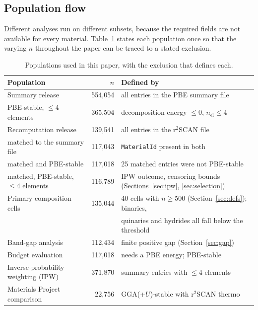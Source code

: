 \documentclass[11pt]{article}
\begin{document}
\subsection{Population flow}\label{sec:popflow}

Different analyses run on different subsets, because the required fields are not
available for every material. Table~\ref{tab:popflow} states each population once so that
the varying $n$ throughout the paper can be traced to a stated exclusion.

\begin{table}[htbp]\centering
\caption{Populations used in this paper, with the exclusion that defines each.}
\label{tab:popflow}
\small
\begin{tabular}{lrl}
\toprule
Population & $n$ & Defined by \\
\midrule
Summary release                  & 554{,}054 & all entries in the PBE summary file \\
\quad PBE-stable, $\le$4 elements & 365{,}504 & decomposition energy $\le 0$, $n_{\text{el}}\le4$ \\
Recomputation release            & 139{,}541 & all entries in the r$^2$SCAN file \\
\quad matched to the summary file & 117{,}043 & \texttt{MaterialId} present in both \\
\quad matched and PBE-stable      & 117{,}018 & 25 matched entries were not PBE-stable \\
\quad matched, PBE-stable, $\le$4 elements & 116{,}789 & IPW outcome, censoring bounds (Sections~\ref{sec:ipw}, \ref{sec:selection}) \\
Primary composition cells        & 135{,}044 & 40 cells with $n\ge500$ (Section~\ref{sec:defs}); binaries, \\
                                 &           & quinaries and hydrides all fall below the threshold \\
Band-gap analysis                & 112{,}434 & finite positive gap (Section~\ref{sec:gap}) \\
Budget evaluation                & 117{,}018 & needs a PBE energy; PBE-stable \\
Inverse-probability weighting (IPW) & 371{,}870 & summary entries with $\le$4 elements \\
Materials Project comparison     & \phantom{0}22{,}756 & GGA(+$U$)-stable with r$^2$SCAN thermo \\
\bottomrule
\end{tabular}
\end{table}
\end{document}
